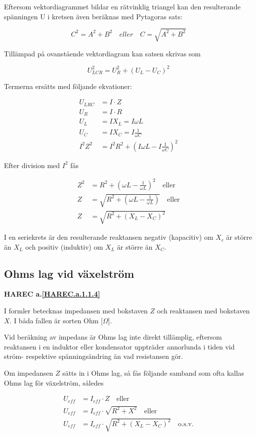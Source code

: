 Eftersom vektordiagrammet bildar en rätvinklig triangel kan den resulterande
spänningen U i kretsen även beräknas med Pytagoras sats:

\[C^2 = A^2 + B^2 \quad eller \quad C = \sqrt{A^2 + B^2}\]

Tillämpad på ovanstående vektordiagram kan satsen skrivas som

\[U_{LCR}^2 = U_R^2 + ( U_L - U_C)^2\]

Termerna ersätts med följande ekvationer:

\begin{align*}
  U_{LRC} &= I \cdot Z \\
  U_R &= I \cdot R \\
  U_L &= I X_L = I \omega L \\
  U_C &= I X_C = I \frac{1}{\omega C} \\
  I^2 Z^2 &= I^2 R^2 + ( I \omega L - I\frac{1}{\omega C})^2
\end{align*}

Efter division med \(I^2\) fås

\begin{align*}
  Z^2 &= R^2 + ( \omega L - \frac{1}{\omega L} )^2 \quad \text{eller} \\
  Z &= \sqrt{R^2 + (\omega L - \frac{1}{\omega L})} \quad \text{eller} \\
  Z &= \sqrt{R^2 + (X_L - X_C)^2}
\end{align*}

I en seriekrets är den resulterande reaktansen negativ (kapacitiv) om \(X_c\) är
större än \(X_L\) och positiv (induktiv) om \(X_L\) är större än \(X_C\).

\subsection{Ohms lag vid växelström}
\textbf{HAREC
  a.\ref{HAREC.a.1.1.4}\label{myHAREC.a.1.1.4b}
}

I formler betecknas impedansen med bokstaven \(Z\) och reaktansen med bokstaven
\(X\). I båda fallen är sorten Ohm [\(Ω\)].

Vid beräkning av impedans är Ohms lag inte direkt tillämplig, eftersom
reaktansen i en induktor eller kondensator uppträder annorlunda i tiden vid
ström- respektive spänningsändring än vad resistansen gör.

Om impedansen \(Z\) sätts in i Ohms lag, så fås följande samband som ofta kallas
Ohms lag för växelström, således

\begin{align*}
  U_{eff} &= I_{eff} \cdot Z \quad \text{eller} \\
  U_{eff} &= I_{eff} \cdot \sqrt{R^2 + X^2} \quad \text{eller} \\
  U_{eff} &= I_{eff} \cdot \sqrt{R^2 + (X_L - X_C)^2} \quad \text{o.s.v.}
\end{align*}

